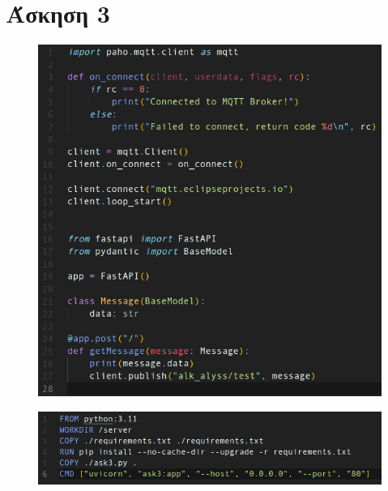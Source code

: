 \documentclass{article}
\begin{document}
\section*{Άσκηση 3}
	\begin{figure}[H]
		\includegraphics[width=\textwidth]{"8.png"}
	\end{figure}
	\begin{figure}[H]
		\includegraphics[width=\textwidth]{"9.png"}
	\end{figure}
\end{document}
